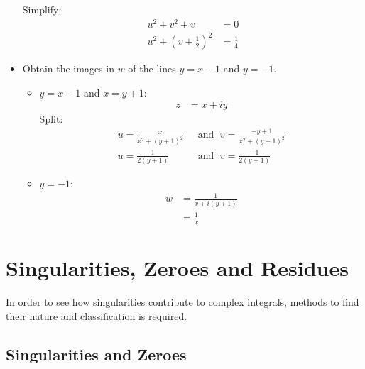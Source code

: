 \documentclass[10pt,a4paper]{article}
\begin{document}
\begin{itemize}
    Simplify:
    \begin{align*}
        u^2 + v^2 + v &= 0 \\
        u^2 + \left(v+\frac{1}{2}\right)^2 &= \frac{1}{4}
    \end{align*}

    \item Obtain the images in $w$ of the lines $y=x-1$ and $y=-1$.
    \begin{itemize}
        \item $y=x-1$ and $x=y+1$:
        \begin{align*}
            z &= x+ iy            
        \end{align*}
        Split:
        \begin{align*}
            u = \frac{x}{x^2 + (y+1)^2} \; &\text{ and } \; v = \frac{-y+1}{x^2 + (y+1)^2} \\ 
            u = \frac{1}{2(y+1)} \; &\text{ and } \; v = \frac{-1}{2(y+1)}
        \end{align*}

        \item $y=-1$:
        \begin{align*}
            w &= \frac{1}{x+i(y+1)} \\
            &= \frac{1}{x}
        \end{align*}
    \end{itemize}

\end{itemize}






\pagebreak

\section{Singularities, Zeroes and Residues}

In order to see how singularities contribute to complex integrals, methods to find their nature and
classification is required.

\subsection{Singularities and Zeroes}
\end{document}
